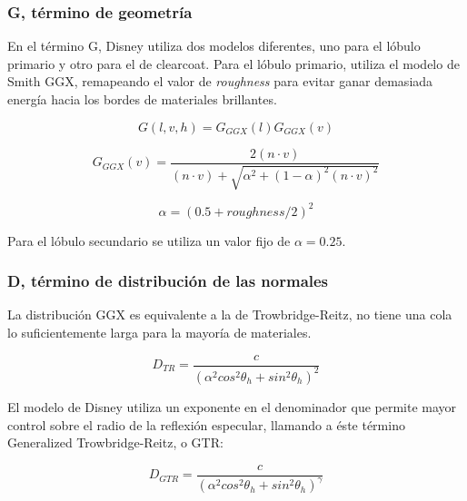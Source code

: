             \subsubsection{G, t\'ermino de geometr\'ia}
                En el t\'ermino G, Disney utiliza dos modelos diferentes, uno para el l\'obulo primario y otro para el de clearcoat.
                Para el l\'obulo primario, utiliza el modelo de Smith GGX, remapeando el valor de \textit{roughness} para evitar
                ganar demasiada energ\'ia hacia los bordes de materiales brillantes.
    
                $$
                G(l, v, h) = G_{GGX}(l)G_{GGX}(v)
                $$
    
                $$
                G_{GGX}(v) = \frac
                {2 (n \cdot{v})}
                {(n \cdot{v}) + \sqrt{ \alpha^2 + (1 - \alpha)^2 (n \cdot{v})^2 }}
                $$
    
                \begin{equation}
                \alpha = (0.5 + roughness / 2)^2
                \end{equation}
                \singlespacing
    
                Para el l\'obulo secundario se utiliza un valor fijo de $\alpha = 0.25$.
    
            \subsubsection{D, t\'ermino de distribuci\'on de las normales}
                La distribuci\'on GGX es equivalente a la de Trowbridge-Reitz, no tiene una cola lo suficientemente larga para la
                mayor\'ia de materiales.
    
                \begin{equation}
                    D_{TR} = \frac
                    {c}
                    {(\alpha^2 cos^2 \theta_h + sin^2 \theta_h)^2}
                \end{equation}
                \singlespacing
    
                El modelo de Disney utiliza un exponente en el denominador que permite mayor control sobre el radio de la reflexi\'on
                especular, llamando a \'este t\'ermino Generalized Trowbridge-Reitz, o GTR:
    
                \begin{equation}
                    D_{GTR} = \frac
                    {c}
                    {(\alpha^2 cos^2 \theta_h + sin^2 \theta_h)^\gamma}
                \end{equation}
                \singlespacing
    
